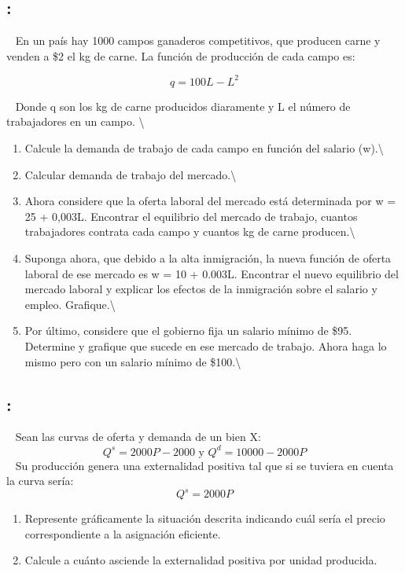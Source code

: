 \documentclass[
  letterpaper,
  DIV=11,
  numbers=noendperiod]{scrreport}
\providecommand{\tightlist}{%
  \setlength{\itemsep}{0pt}\setlength{\parskip}{0pt}}\usepackage{longtable,booktabs,array}
\begin{document}
\hypertarget{section-44}{%
\subsection{:}\label{section-44}}

~ En un país hay 1000 campos ganaderos competitivos, que producen carne
y venden a \$2 el kg de carne. La función de producción de cada campo
es:

\[q = 100L - L^2\]

~ Donde q son los kg de carne producidos diaramente y L el número de
trabajadores en un campo. \textbackslash{}

\begin{enumerate}
\def\labelenumi{\alph{enumi})}
\tightlist
\item
  Calcule la demanda de trabajo de cada campo en función del salario
  (w).\textbackslash{}
\item
  Calcular demanda de trabajo del mercado.\textbackslash{}
\item
  Ahora considere que la oferta laboral del mercado está determinada por
  w = 25 + 0,003L. Encontrar el equilibrio del mercado de trabajo,
  cuantos trabajadores contrata cada campo y cuantos kg de carne
  producen.\textbackslash{}
\item
  Suponga ahora, que debido a la alta inmigración, la nueva función de
  oferta laboral de ese mercado es w = 10 + 0.003L. Encontrar el nuevo
  equilibrio del mercado laboral y explicar los efectos de la
  inmigración sobre el salario y empleo. Grafique.\textbackslash{}
\item
  Por último, considere que el gobierno fija un salario mínimo de \$95.
  Determine y grafique que sucede en ese mercado de trabajo. Ahora haga
  lo mismo pero con un salario mínimo de \$100.\textbackslash{}
\end{enumerate}

\hypertarget{section-45}{%
\subsection{:}\label{section-45}}

~ Sean las curvas de oferta y demanda de un bien X:
\[Q^{s} = 2000P - 2000 \text{ y } Q^{d} = 10000 - 2000P\] ~ Su
producción genera una externalidad positiva tal que si se tuviera en
cuenta la curva sería: \[Q^{s} = 2000P\]

\begin{enumerate}
\def\labelenumi{\alph{enumi})}
\item
  Represente gráficamente la situación descrita indicando cuál sería el
  precio correspondiente a la asignación eficiente.
\item
  Calcule a cuánto asciende la externalidad positiva por unidad
  producida.
\end{enumerate}
\end{document}
